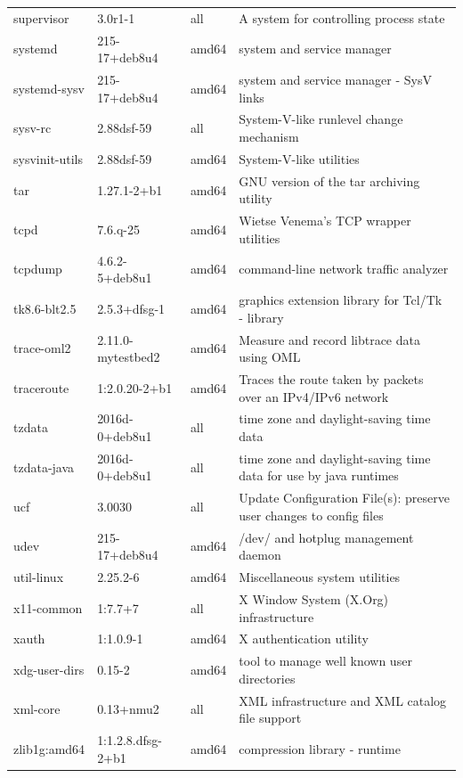 \documentclass[a4paper,10pt]{article}
\begin{document}
\begin{appendices}
{\begin{longtable}{p{3.25cm}@{\hspace{0.25cm}}p{4cm}@{\hspace{0.25cm}}l@{\hspace{0.25cm}}p{7cm}}
supervisor	&	3.0r1-1	&	all	&	A system for controlling process state	\\
systemd	&	215-17+deb8u4	&	amd64	&	system and service manager	\\
systemd-sysv	&	215-17+deb8u4	&	amd64	&	system and service manager - SysV links	\\
sysv-rc	&	2.88dsf-59	&	all	&	System-V-like runlevel change mechanism	\\
sysvinit-utils	&	2.88dsf-59	&	amd64	&	System-V-like utilities	\\
tar	&	1.27.1-2+b1	&	amd64	&	GNU version of the tar archiving utility	\\
tcpd	&	7.6.q-25	&	amd64	&	Wietse Venema's TCP wrapper utilities	\\
tcpdump	&	4.6.2-5+deb8u1	&	amd64	&	command-line network traffic analyzer	\\
tk8.6-blt2.5	&	2.5.3+dfsg-1	&	amd64	&	graphics extension library for Tcl/Tk - library	\\
trace-oml2	&	2.11.0-mytestbed2	&	amd64	&	Measure and record libtrace data using OML	\\
traceroute	&	1:2.0.20-2+b1	&	amd64	&	Traces the route taken by packets over an IPv4/IPv6 network	\\
tzdata	&	2016d-0+deb8u1	&	all	&	time zone and daylight-saving time data	\\
tzdata-java	&	2016d-0+deb8u1	&	all	&	time zone and daylight-saving time data for use by java runtimes	\\
ucf	&	3.0030	&	all	&	Update Configuration File(s): preserve user changes to config files	\\
udev	&	215-17+deb8u4	&	amd64	&	/dev/ and hotplug management daemon	\\
util-linux	&	2.25.2-6	&	amd64	&	Miscellaneous system utilities	\\
x11-common	&	1:7.7+7	&	all	&	X Window System (X.Org) infrastructure	\\
xauth	&	1:1.0.9-1	&	amd64	&	X authentication utility	\\
xdg-user-dirs	&	0.15-2	&	amd64	&	tool to manage well known user directories	\\
xml-core	&	0.13+nmu2	&	all	&	XML infrastructure and XML catalog file support	\\
zlib1g:amd64	&	1:1.2.8.dfsg-2+b1	&	amd64	&	compression library - runtime	\\
	\bottomrule
\end{longtable}
}




\end{appendices}
\end{document}
